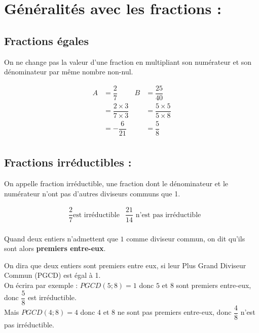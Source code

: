 \documentclass[nocrop]{sesamanuel_guyon}
\begin{document}
	
		
	
	\cours 
	
	
	\section{Généralités avec les fractions :}
	\subsection{Fractions égales}
	
	
	\begin{propriete}
			On ne change pas la valeur d'une fraction en multipliant son numérateur et son dénominateur par même nombre non-nul.
	\end{propriete}
	
	\begin{exemple*1}
		\begin{align*}
				A&=\dfrac{2}{7}&B&=\dfrac{25}{40}\\
				&=\dfrac{2\times 3}{7\times 3}&&=\dfrac{5\times5}{5\times 8}\\
				&=-\dfrac{6}{21}&&=\dfrac{5}{8}\\
		\end{align*}
	\end{exemple*1}
	
\subsection{Fractions irréductibles :}	
	\begin{definition}
		On appelle fraction irréductible, une fraction dont le dénominateur et le numérateur n'ont pas d'autres diviseurs communs que 1.
	\end{definition}	
\begin{exemple*1}	
		\begin{align*}
				&\dfrac{2}{7}  \text{est irréductible}&\dfrac{21}{14} \text{ n'est pas irréductible}\\
		\end{align*}
		\end{exemple*1}
	
	\begin{remarque}
		Quand deux entiers n'admettent que $1$ comme diviseur commun, on dit qu'ils sont alors \textbf{premiers entre-eux}.\\
	\end{remarque}
\begin{approfondissement}
	
On dira que deux entiers sont premiers entre eux, si leur Plus Grand Diviseur Commun (PGCD) est égal à 1.\\
On écrira par exemple : $PGCD(5;8)=1$ donc $5$ et $8$ sont premiers entre-eux, donc $\dfrac{5}{8}$ est irréductible.\\
Mais $PGCD(4;8)=4$ donc $4$ et $8$ ne sont pas premiers entre-eux, donc $\dfrac{4}{8}$ n'est pas irréductible.
	\end{approfondissement}
	\exercicesbase
	
\end{document}
